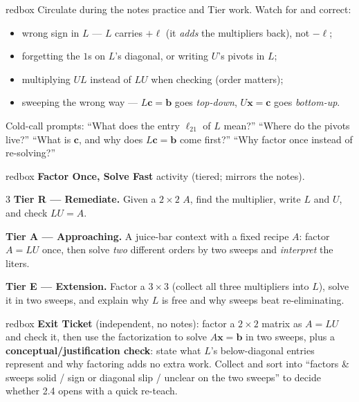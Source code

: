 \documentclass[10pt]{article}
\newcommand{\xx}{\mathbf{x}}
\newcommand{\bb}{\mathbf{b}}
\newcommand{\cc}{\mathbf{c}}
\begin{document}
\begin{skillbox}{redbox}
Circulate during the notes practice and Tier work. Watch for and correct:
\begin{itemize}[leftmargin=1.2em, nosep]
  \item wrong sign in $L$ --- $L$ carries $+\ell$ (it \emph{adds} the multipliers back), not $-\ell$;
  \item forgetting the $1$s on $L$'s diagonal, or writing $U$'s pivots in $L$;
  \item multiplying $UL$ instead of $LU$ when checking (order matters);
  \item sweeping the wrong way --- $L\cc=\bb$ goes \emph{top-down}, $U\xx=\cc$ goes \emph{bottom-up}.
\end{itemize}
Cold-call prompts: ``What does the entry $\ell_{21}$ of $L$ mean?'' ``Where do the pivots live?''
``What is $\cc$, and why does $L\cc=\bb$ come first?'' ``Why factor once instead of re-solving?''
\end{skillbox}

\begin{skillbox}{redbox}
\textbf{Factor Once, Solve Fast} activity (tiered; mirrors the notes).
\begin{multicols}{3}
\textbf{Tier R --- Remediate.} Given a $2\times2$ $A$, find the multiplier, write $L$ and $U$, and
check $LU=A$.

\columnbreak
\textbf{Tier A --- Approaching.} A juice-bar context with a fixed recipe $A$: factor $A=LU$ once, then
solve \emph{two} different orders by two sweeps and \emph{interpret} the liters.

\columnbreak
\textbf{Tier E --- Extension.} Factor a $3\times3$ (collect all three multipliers into $L$), solve it in
two sweeps, and explain why $L$ is free and why sweeps beat re-eliminating.
\end{multicols}
\end{skillbox}

\begin{skillbox}{redbox}
\textbf{Exit Ticket} (independent, no notes): factor a $2\times2$ matrix as $A=LU$ and check it, then
use the factorization to solve $A\xx=\bb$ in two sweeps, plus a \textbf{conceptual/justification
check}: state what $L$'s below-diagonal entries represent and why factoring adds no extra work.
Collect and sort into ``factors \& sweeps solid / sign or diagonal slip / unclear on the two sweeps''
to decide whether 2.4 opens with a quick re-teach.
\end{skillbox}
\end{document}

